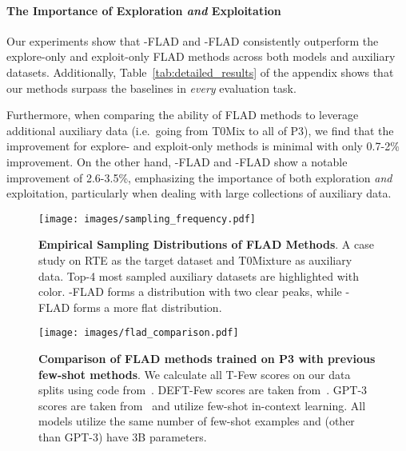 \paragraph{The Importance of Exploration \textit{and} Exploitation}
Our experiments show that \ex{}-FLAD and \ucb{}-FLAD consistently outperform the explore-only and exploit-only FLAD methods across both models and auxiliary datasets. Additionally, Table~\ref{tab:detailed_results} of the appendix shows that our methods surpass the baselines in \textit{every} evaluation task.

Furthermore, when comparing the ability of FLAD methods to leverage additional auxiliary data (i.e.\ going from T0Mix to all of P3), we find that the improvement for explore- and exploit-only methods is minimal with only 0.7-2\% improvement. On the other hand, \ex{}-FLAD and \ucb{}-FLAD show a notable improvement of 2.6-3.5\%, emphasizing the importance of both exploration \textit{and} exploitation, particularly when dealing with large collections of auxiliary data.


\begin{figure}[t]
    \centering
    \texttt{[image: images/sampling\_frequency.pdf]}
    \vspace{-2mm}
    \caption{\textbf{Empirical Sampling Distributions of FLAD Methods}. A case study on RTE as the target dataset and T0Mixture as auxiliary data.
    Top-4 most sampled auxiliary datasets are highlighted with color. \ucb{}-FLAD forms a distribution with two clear peaks, while \ex{}-FLAD forms a more flat distribution.}
    \label{fig:sampling_frequency}
\end{figure}

\begin{figure*}
    \centering
    \texttt{[image: images/flad\_comparison.pdf]}
    \vspace{-2mm}
    \caption{\textbf{Comparison of FLAD methods trained on P3 with previous few-shot methods}. We calculate all T-Few scores on our data splits using code from~\citet{liu2020tfew}. DEFT-Few scores are taken from~\citet{Ivison2022DEFT}. GPT-3 scores are taken from~\citet{NEURIPS2020_1457c0d6} and utilize few-shot in-context learning. All models utilize the same number of few-shot examples and (other than GPT-3) have 3B parameters.}
    \label{fig:comparison}
\end{figure*}


